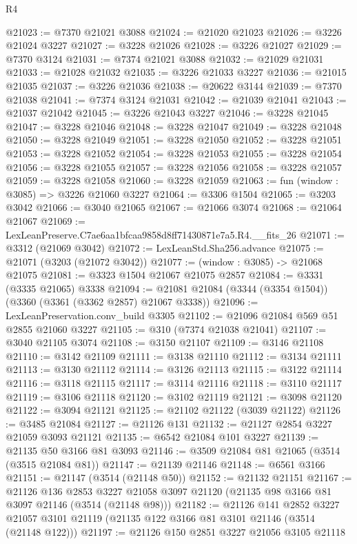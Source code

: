 \begin{lexlean}{R4}
\begin{coremodule}
@21023 := @7370 @21021 @3088
@21024 := @21020 @21023
@21026 := @3226 @21024 @3227
@21027 := @3228 @21026
@21028 := @3226 @21027
@21029 := @7370 @3124
@21031 := @7374 @21021 @3088
@21032 := @21029 @21031
@21033 := @21028 @21032
@21035 := @3226 @21033 @3227
@21036 := @21015 @21035
@21037 := @3226 @21036
@21038 := @20622 @3144
@21039 := @7370 @21038
@21041 := @7374 @3124 @21031
@21042 := @21039 @21041
@21043 := @21037 @21042
@21045 := @3226 @21043 @3227
@21046 := @3228 @21045
@21047 := @3228 @21046
@21048 := @3228 @21047
@21049 := @3228 @21048
@21050 := @3228 @21049
@21051 := @3228 @21050
@21052 := @3228 @21051
@21053 := @3228 @21052
@21054 := @3228 @21053
@21055 := @3228 @21054
@21056 := @3228 @21055
@21057 := @3228 @21056
@21058 := @3228 @21057
@21059 := @3228 @21058
@21060 := @3228 @21059
@21063 := fun (window : @3085) => @3226 @21060 @3227
@21064 := @3306 @1504
@21065 := @3203 @3042
@21066 := @3040 @21065
@21067 := @21066 @3074
@21068 := @21064 @21067
@21069 := LexLeanPreserve.C7ae6aa1bfcaa9858d8ff71430871e7a5.R4.__fits_26
@21071 := @3312 (@21069 @3042)
@21072 := LexLeanStd.Sha256.advance
@21075 := @21071 (@3203 (@21072 @3042))
@21077 := (window : @3085) -> @21068 @21075
@21081 := @3323 @1504 @21067 @21075 @2857
@21084 := @3331 (@3335 @21065) @3338
@21094 := @21081 @21084 (@3344 (@3354 @1504)) (@3360 (@3361 (@3362 @2857) @21067 @3338))
@21096 := LexLeanPreservation.conv_build @3305
@21102 := @21096 @21084 @569 @51 @2855 @21060 @3227
@21105 := @310 (@7374 @21038 @21041)
@21107 := @3040 @21105 @3074
@21108 := @3150 @21107
@21109 := @3146 @21108
@21110 := @3142 @21109
@21111 := @3138 @21110
@21112 := @3134 @21111
@21113 := @3130 @21112
@21114 := @3126 @21113
@21115 := @3122 @21114
@21116 := @3118 @21115
@21117 := @3114 @21116
@21118 := @3110 @21117
@21119 := @3106 @21118
@21120 := @3102 @21119
@21121 := @3098 @21120
@21122 := @3094 @21121
@21125 := @21102 @21122 (@3039 @21122)
@21126 := @3485 @21084
@21127 := @21126 @131
@21132 := @21127 @2854 @3227 @21059 @3093 @21121
@21135 := @6542 @21084 @101 @3227
@21139 := @21135 @50 @3166 @81 @3093
@21146 := @3509 @21084 @81 @21065 (@3514 (@3515 @21084 @81))
@21147 := @21139 @21146
@21148 := @6561 @3166
@21151 := @21147 (@3514 (@21148 @50))
@21152 := @21132 @21151
@21167 := @21126
    @136
    @2853
    @3227
    @21058
    @3097
    @21120
    (@21135 @98 @3166 @81 @3097 @21146 (@3514 (@21148 @98)))
@21182 := @21126
    @141
    @2852
    @3227
    @21057
    @3101
    @21119
    (@21135 @122 @3166 @81 @3101 @21146 (@3514 (@21148 @122)))
@21197 := @21126
    @150
    @2851
    @3227
    @21056
    @3105
    @21118

\end{coremodule}
\end{lexlean}
